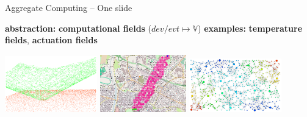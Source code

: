 \documentclass[presentation, 8pt,169]{beamer}\mode<presentation>{\usetheme{AMSBolognaFC}}
\newcommand{\lbl}[1]{\textbf{\textcolor{gray!90!white}{#1}}}
\newcommand{\bo}[1]{\textbf{#1}}
\begin{document}
\begin{frame}{Aggregate Computing -- One slide}
{  \begin{block}{} %
    \scriptsize
  \lbl{abstraction:} \bo{computational fields} ($\mathit{dev/evt} \mapsto \mathbb{V}$) \vspace{0.1cm}
    \lbl{examples:} \bo{temperature fields}, \bo{actuation fields} \vspace{0.1cm}
    \begin{center}
      \includegraphics[width=0.3\textwidth]{img/3d-gradient.png}
      \includegraphics[width=0.28\textwidth]{img/channel.png}
      \includegraphics[width=0.3\textwidth]{img/scr-result.png}
      \end{center}
  \tiny {}
  \end{block}
  }
  
\end{frame}
\end{document}
